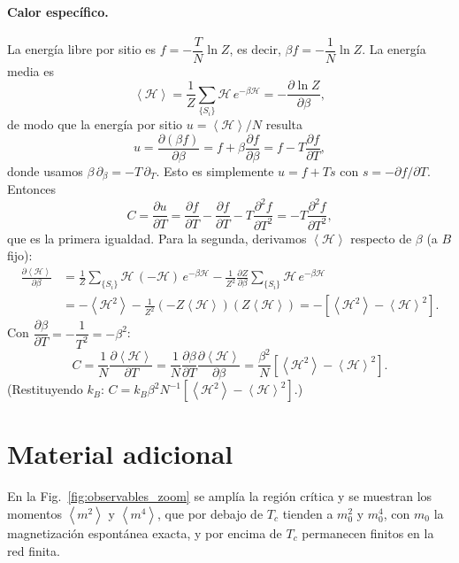 \documentclass[a4paper,11pt]{article}
\newcommand{\expval}[1]{\left\langle #1 \right\rangle}
\newcommand{\Tc}{T_c}
\begin{document}
\paragraph{Calor específico.}
La energía libre por sitio es $f = -\dfrac{T}{N}\ln Z$, es decir, $\beta f = -\dfrac{1}{N}\ln Z$. La energía media es
\begin{equation*}
    \expval{\mathcal{H}} = \frac{1}{Z}\sum_{\{S_i\}} \mathcal{H}\, e^{-\beta\mathcal{H}} = -\frac{\partial \ln Z}{\partial \beta},
\end{equation*}
de modo que la energía por sitio $u = \expval{\mathcal{H}}/N$ resulta
\begin{equation*}
    u = \frac{\partial (\beta f)}{\partial \beta} = f + \beta\frac{\partial f}{\partial \beta} = f - T\frac{\partial f}{\partial T},
\end{equation*}
donde usamos $\beta\,\partial_\beta = -T\,\partial_T$. Esto es simplemente $u = f + Ts$ con $s = -\partial f/\partial T$. Entonces
\begin{equation*}
    C = \frac{\partial u}{\partial T}
    = \frac{\partial f}{\partial T} - \frac{\partial f}{\partial T} - T\frac{\partial^2 f}{\partial T^2}
    = -T\frac{\partial^2 f}{\partial T^2},
\end{equation*}
que es la primera igualdad. Para la segunda, derivamos $\expval{\mathcal{H}}$ respecto de $\beta$ (a $B$ fijo):
\begin{align*}
    \frac{\partial \expval{\mathcal{H}}}{\partial \beta}
    &= \frac{1}{Z}\sum_{\{S_i\}} \mathcal{H}\,(-\mathcal{H})\, e^{-\beta\mathcal{H}}
       - \frac{1}{Z^2}\frac{\partial Z}{\partial \beta}\sum_{\{S_i\}} \mathcal{H}\, e^{-\beta\mathcal{H}} \\
    &= -\expval{\mathcal{H}^2} - \frac{1}{Z^2}\left(-Z\expval{\mathcal{H}}\right)\left(Z\expval{\mathcal{H}}\right)
     = -\left[ \expval{\mathcal{H}^2} - \expval{\mathcal{H}}^2 \right].
\end{align*}
Con $\dfrac{\partial \beta}{\partial T} = -\dfrac{1}{T^2} = -\beta^2$:
\begin{equation*}
    C = \frac{1}{N}\frac{\partial \expval{\mathcal{H}}}{\partial T}
      = \frac{1}{N}\frac{\partial \beta}{\partial T}\frac{\partial \expval{\mathcal{H}}}{\partial \beta}
      = \frac{\beta^2}{N}\left[ \expval{\mathcal{H}^2} - \expval{\mathcal{H}}^2 \right].
\end{equation*}
(Restituyendo $k_B$: $C = k_B\beta^2 N^{-1}\left[\expval{\mathcal{H}^2}-\expval{\mathcal{H}}^2\right]$.)

\section{Material adicional}
\label{app:material}
En la Fig.~\ref{fig:observables_zoom} se amplía la región crítica y se muestran los momentos $\expval{m^2}$ y $\expval{m^4}$, que por debajo de $\Tc$ tienden a $m_0^2$ y $m_0^4$, con $m_0$ la magnetización espontánea exacta, y por encima de $\Tc$ permanecen finitos en la red finita.
\end{document}
